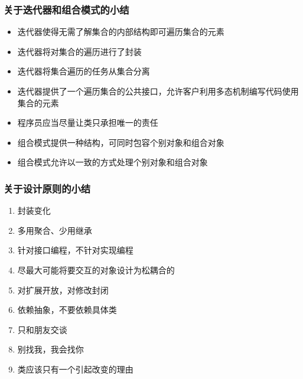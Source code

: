 \documentclass[compress]{beamer}
\begin{document}
\begin{frame}
\frametitle{关于迭代器和组合模式的小结}
\begin{itemize}
\item 迭代器使得无需了解集合的内部结构即可遍历集合的元素
\item 迭代器将对集合的遍历进行了封装
\item 迭代器将集合遍历的任务从集合分离
\item 迭代器提供了一个遍历集合的公共接口，允许客户利用多态机制编写代码使用集合的元素
\item 程序员应当尽量让类只承担唯一的责任
\item 组合模式提供一种结构，可同时包容个别对象和组合对象
\item 组合模式允许以一致的方式处理个别对象和组合对象
\end{itemize}
\end{frame}

\begin{frame}
\frametitle{关于设计原则的小结}
  \begin{enumerate}
    \item 封装变化
    \item 多用聚合、少用继承
    \item 针对接口编程，不针对实现编程
    \item 尽最大可能将要交互的对象设计为松耦合的
    \item 对扩展开放，对修改封闭
    \item 依赖抽象，不要依赖具体类
    \item 只和朋友交谈
    \item 别找我，我会找你
    \item 类应该只有一个引起改变的理由
  \end{enumerate}
\end{frame}
\end{document}
